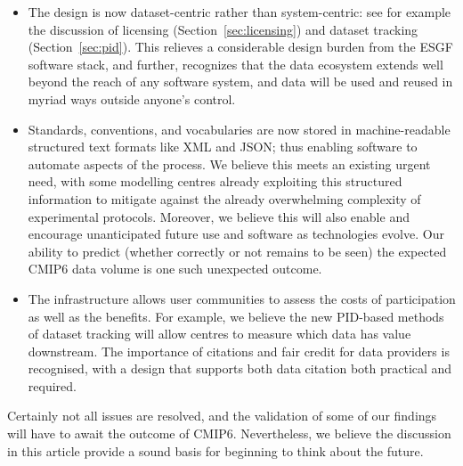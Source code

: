 \documentclass[gmd,manuscript]{copernicus}
\newcommand{\secref}[1] {\mbox{Section  \ref{sec:#1}}}
\begin{document}
\begin{itemize}
\item The design is now dataset-centric rather than system-centric:
  see for example the discussion of licensing (\secref{licensing}) and
  dataset tracking (\secref{pid}). This relieves a considerable design
  burden from the ESGF software stack, and further, recognizes that the
  data ecosystem extends well beyond the reach of any software system,
  and data will be used and reused in myriad ways outside anyone's
  control.
\item Standards, conventions, and vocabularies are now stored in
  machine-readable structured text formats like XML and JSON; thus
  enabling software to automate aspects of the
  process. We believe this meets an existing urgent need, with some
  modelling centres already exploiting this structured information
  to mitigate against the already overwhelming complexity of experimental
  protocols.
  Moreover, we believe this will also enable and encourage
  unanticipated future use and software as
  technologies evolve. Our ability to predict (whether correctly or
  not remains to be seen) the expected CMIP6 data volume is one such
  unexpected outcome.
\item The infrastructure allows user communities to
  assess the costs of participation as well as the benefits. For example,
  we believe the new PID-based methods of dataset tracking
  will allow centres to measure which data has value downstream. The
  importance of citations and fair credit for data
  providers is recognised, with a design that supports both data citation 
  both practical and required.
\end{itemize}


Certainly not all issues are resolved, and the validation of some of
our findings will have to await the outcome of CMIP6. Nevertheless, we
believe the discussion in this article provide a sound basis for
beginning to think about the future.
\end{document}
